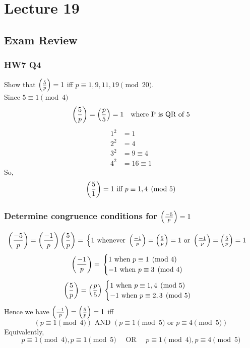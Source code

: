 \chapter{Lecture 19}
\date{October 31, 2024}

\section{Exam Review}
    \subsection{HW7 Q4}
    Show that $\left( \frac{5}{p} \right) =1$ iff $p\equiv 1,9,11,19\pmod{20}$. \\
    Since $5\equiv 1\pmod{4}$
    \[
        \left( \frac{5}{p} \right)  = \left( \frac{p}{5} \right)  = 1 \quad\text{where P is QR of 5}
    \]
    \begin{align*}
        1^2 &= 1 \\
        2^2 &= 4 \\
        3^2 &= 9 \equiv 4 \\
        4^2 &= 16 \equiv 1
    \end{align*}
    So, 
    \[
        \left( \frac{5}{1} \right)  = 1 \text{ iff } p\equiv 1,4\pmod{5}
    \]

    \subsection{Determine congruence conditions for $\left( \frac{-5}{p} \right) =1$}
    \[
        \left( \frac{-5}{p} \right)  = \left( \frac{-1}{p} \right) \left( \frac{5}{p} \right)  = \\
        \begin{cases}
            1 \text{ whenever } \left( \frac{-1}{p} \right) =\left( \frac{5}{p} \right) =1 \text{ or } \left( \frac{-1}{p} \right)  = \left( \frac{5}{p} \right)  = 1
        \end{cases}
    \]
    \[
        \left( \frac{-1}{p} \right)  = \\
        \begin{cases}
            1 \text{ when } p\equiv 1\pmod{4} \\
            -1 \text{ when } p\equiv 3\pmod{4}
        \end{cases}
    \]
    \[
        \left( \frac{5}{p} \right)  = \left( \frac{p}{5} \right)  \\
        \begin{cases}
            1 \text{ when } p\equiv 1,4\pmod{5} \\
            -1 \text{ when } p\equiv 2,3\pmod{5}
        \end{cases}
    \]
    Hence we have $\left( \frac{-1}{p} \right)  = \left( \frac{5}{p} \right)  = 1$ iff 
    \[
        (p\equiv 1\pmod{4}) \text{ AND } (p\equiv 1\pmod{5} \text{ or } p\equiv 4\pmod{5})
    \]
    Equivalently, 
    \[
        p\equiv 1\pmod{4}, p\equiv 1\pmod{5} \quad\text{ OR }\quad p\equiv 1\pmod{4}, p\equiv 4\pmod{5}
    \]

